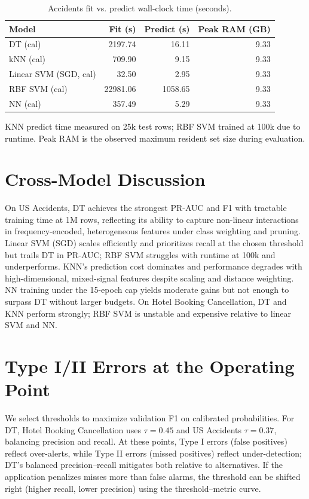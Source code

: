 \documentclass[conference]{IEEEtran}
\newcommand{\datasetA}{Hotel Booking Cancellation}
\newcommand{\datasetB}{US Accidents}
\begin{document}
\begin{table}[htbp]
\caption{Accidents fit vs. predict wall-clock time (seconds).}
\begin{center}
\begin{tabular}{|l|r|r|r|}
\hline
Model & Fit (s) & Predict (s) & Peak RAM (GB) \\
\hline
DT (cal) & 2197.74 & 16.11 & 9.33 \\
kNN (cal) & 709.90 & 9.15 & 9.33 \\
Linear SVM (SGD, cal) & 32.50 & 2.95 & 9.33 \\
RBF SVM (cal) & 22981.06 & 1058.65 & 9.33 \\
NN (cal) & 357.49 & 5.29 & 9.33 \\
\hline
\end{tabular}
\end{center}
\vspace{2pt}\footnotesize KNN predict time measured on 25k test rows; RBF SVM trained at 100k due to runtime. Peak RAM is the observed maximum resident set size during evaluation.
\end{table}

\section{Cross-Model Discussion}
On \datasetB{}, DT achieves the strongest PR-AUC and F1 with tractable training time at 1M rows, reflecting its ability to capture non-linear interactions in frequency-encoded, heterogeneous features under class weighting and pruning. Linear SVM (SGD) scales efficiently and prioritizes recall at the chosen threshold but trails DT in PR-AUC; RBF SVM struggles with runtime at 100k and underperforms. KNN's prediction cost dominates and performance degrades with high-dimensional, mixed-signal features despite scaling and distance weighting. NN training under the 15-epoch cap yields moderate gains but not enough to surpass DT without larger budgets. On \datasetA{}, DT and KNN perform strongly; RBF SVM is unstable and expensive relative to linear SVM and NN.

\section{Type I/II Errors at the Operating Point}
We select thresholds to maximize validation F1 on calibrated probabilities. For DT, \datasetA{} uses $\tau\!=\!0.45$ and \datasetB{} $\tau\!=\!0.37$, balancing precision and recall. At these points, Type I errors (false positives) reflect over-alerts, while Type II errors (missed positives) reflect under-detection; DT's balanced precision–recall mitigates both relative to alternatives. If the application penalizes misses more than false alarms, the threshold can be shifted right (higher recall, lower precision) using the threshold–metric curve.
\end{document}
